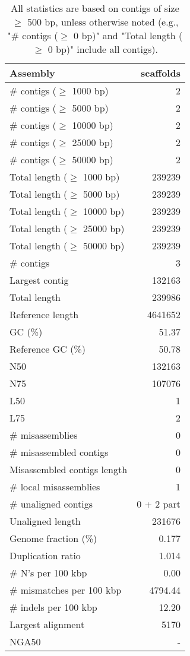 \documentclass[12pt,a4paper]{article}
\begin{document}
\begin{table}[ht]
\begin{center}
\caption{All statistics are based on contigs of size $\geq$ 500 bp, unless otherwise noted (e.g., "\# contigs ($\geq$ 0 bp)" and "Total length ($\geq$ 0 bp)" include all contigs).}
\begin{tabular}{|l*{1}{|r}|}
\hline
Assembly & scaffolds \\ \hline
\# contigs ($\geq$ 1000 bp) & 2 \\ \hline
\# contigs ($\geq$ 5000 bp) & 2 \\ \hline
\# contigs ($\geq$ 10000 bp) & 2 \\ \hline
\# contigs ($\geq$ 25000 bp) & 2 \\ \hline
\# contigs ($\geq$ 50000 bp) & 2 \\ \hline
Total length ($\geq$ 1000 bp) & 239239 \\ \hline
Total length ($\geq$ 5000 bp) & 239239 \\ \hline
Total length ($\geq$ 10000 bp) & 239239 \\ \hline
Total length ($\geq$ 25000 bp) & 239239 \\ \hline
Total length ($\geq$ 50000 bp) & 239239 \\ \hline
\# contigs & 3 \\ \hline
Largest contig & 132163 \\ \hline
Total length & 239986 \\ \hline
Reference length & 4641652 \\ \hline
GC (\%) & 51.37 \\ \hline
Reference GC (\%) & 50.78 \\ \hline
N50 & 132163 \\ \hline
N75 & 107076 \\ \hline
L50 & 1 \\ \hline
L75 & 2 \\ \hline
\# misassemblies & 0 \\ \hline
\# misassembled contigs & 0 \\ \hline
Misassembled contigs length & 0 \\ \hline
\# local misassemblies & 1 \\ \hline
\# unaligned contigs & 0 + 2 part \\ \hline
Unaligned length & 231676 \\ \hline
Genome fraction (\%) & 0.177 \\ \hline
Duplication ratio & 1.014 \\ \hline
\# N's per 100 kbp & 0.00 \\ \hline
\# mismatches per 100 kbp & 4794.44 \\ \hline
\# indels per 100 kbp & 12.20 \\ \hline
Largest alignment & 5170 \\ \hline
NGA50 & - \\ \hline
\end{tabular}
\end{center}
\end{table}
\end{document}
